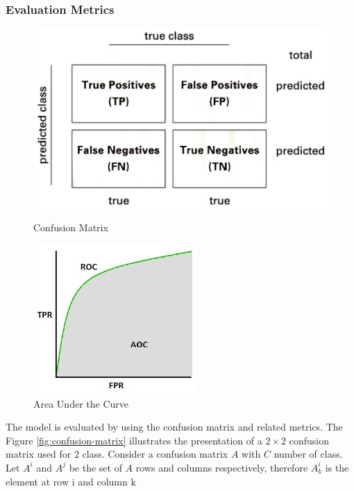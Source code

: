 \documentclass[sensors,article,submit,pdftex,moreauthors]{Definitions/mdpi}
\begin{document}
	\subsubsection{Evaluation Metrics}
	\begin{figure}[!htb]
		\begin{minipage}{0.48\textwidth}
			\centering
			\includegraphics[width=1.1\linewidth]{Definitions/Confusion-matrix}
			\caption{Confusion Matrix}\label{fig:confusion-matrix}
		\end{minipage}\hfill
		\begin{minipage}{0.48\textwidth}
			\centering
			\includegraphics[width=.7\linewidth]{Definitions/AUC}
			\caption{Area Under the Curve}\label{fig:AUC}
		\end{minipage}
	\end{figure}
	The model is evaluated by using the confusion matrix and related metrics. The Figure \ref{fig:confusion-matrix} illustrates the presentation of a $2 \times 2$ confusion matrix used for $2$ class. Consider a confusion matrix $A$ with $C$ number of class. Let $A^i$ and $A^j$ be the set of $A$ rows and columns respectively, therefore $A^i_k$ is the element at row i and column k
\end{document}

